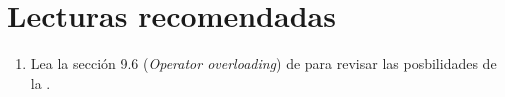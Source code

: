 \section{Lecturas recomendadas}

\begin{enumerate}

\item Lea la sección 9.6 (\emph{Operator overloading}) 
      de \pppbook{}
      para revisar las posbilidades de la .

\end{enumerate}
